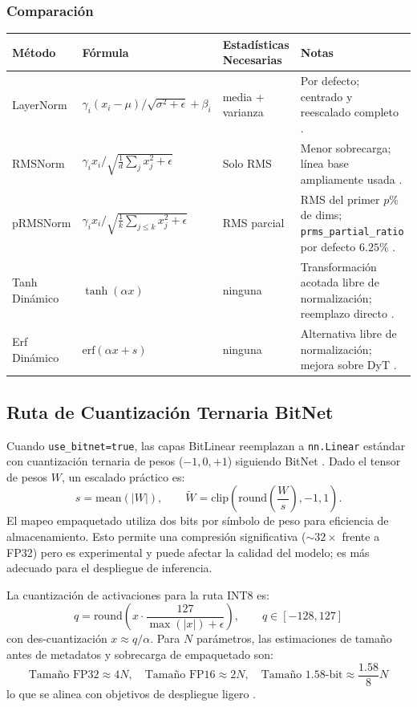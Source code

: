 \subsubsection{Comparación}
\scriptsize
\begin{longtable}{p{2.2cm}p{3.4cm}p{2.0cm}p{4.0cm}}
\toprule
\textbf{Método} & \textbf{Fórmula} & \textbf{Estadísticas Necesarias} & \textbf{Notas} \\
\midrule
\endhead
LayerNorm & $\gamma_i (x_i - \mu)/\sqrt{\sigma^2 + \epsilon} + \beta_i$ & media + varianza & Por defecto; centrado y reescalado completo \citep{ba2016layer}. \\
RMSNorm & $\gamma_i x_i/\sqrt{\frac{1}{d}\sum_j x_j^2+\epsilon}$ & Solo RMS & Menor sobrecarga; línea base ampliamente usada \citep{zhang_root_2019}. \\
pRMSNorm & $\gamma_i x_i/\sqrt{\frac{1}{k}\sum_{j\le k} x_j^2+\epsilon}$ & RMS parcial & RMS del primer $p$\% de dims; \texttt{prms\_partial\_ratio} por defecto $6.25\%$ \citep{zhang_root_2019}. \\
Tanh Dinámico & $\tanh(\alpha x)$ & ninguna & Transformación acotada libre de normalización; reemplazo directo \citep{zhu_transformers_2025}. \\
Erf Dinámico & $\mathrm{erf}(\alpha x+s)$ & ninguna & Alternativa libre de normalización; mejora sobre DyT \citep{chen_stronger_2025}. \\
\bottomrule
\end{longtable}
\normalsize

\subsection{Ruta de Cuantización Ternaria BitNet}

Cuando \texttt{use\_bitnet=true}, las capas BitLinear reemplazan a \texttt{nn.Linear} estándar con cuantización ternaria de pesos ($-1, 0, +1$) siguiendo BitNet \citep{wang_bitnet_2023}. Dado el tensor de pesos $W$, un escalado práctico es:
\[
s=\text{mean}(|W|),\qquad
\tilde{W}=\text{clip}\left(\text{round}\left(\frac{W}{s}\right),-1,1\right).
\]
El mapeo empaquetado utiliza dos bits por símbolo de peso para eficiencia de almacenamiento. Esto permite una compresión significativa ($\sim 32\times$ frente a FP32) pero es experimental y puede afectar la calidad del modelo; es más adecuado para el despliegue de inferencia.

La cuantización de activaciones para la ruta INT8 es:
\[
q=\text{round}\left(x\cdot\frac{127}{\max(|x|)+\epsilon}\right),\qquad q\in[-128,127]
\]
con des-cuantización $x\approx q/\alpha$. Para $N$ parámetros, las estimaciones de tamaño antes de metadatos y sobrecarga de empaquetado son:
\[
\text{Tamaño FP32}\approx 4N,\quad \text{Tamaño FP16}\approx 2N,\quad \text{Tamaño 1.58-bit}\approx \frac{1.58}{8}N
\]
lo que se alinea con objetivos de despliegue ligero \citep{samson_lightweight_2026,bravin_embbert_2026}.

